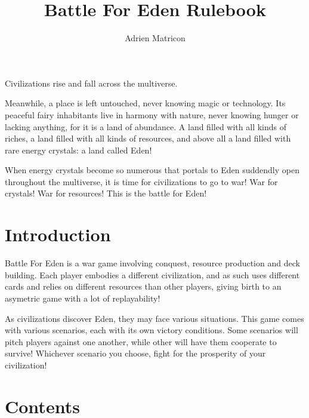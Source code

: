 \documentclass[a4paper]{article}
\author{Adrien Matricon}
\begin{document}
\title{Battle For Eden Rulebook}
\maketitle


    Civilizations rise and fall across the multiverse.

    Meanwhile, a place is left untouched, never knowing magic or technology.
    Its peaceful fairy inhabitants live in harmony with nature, never knowing hunger or lacking anything, for it is a land of abundance.
    A land filled with all kinds of riches, a land filled with all kinds of resources,
    and above all a land filled with rare energy crystals: a land called Eden!

    When energy crystals become so numerous that portals to Eden suddendly open throughout the multiverse,
    it is time for civilizations to go to war! War for crystals! War for resources!
    This is the battle for Eden!



\section{Introduction}

    Battle For Eden is a war game involving conquest, resource production and deck building.
    Each player embodies a different civilization, and as such uses different cards and relies on
    different resources than other players, giving birth to an asymetric game with a lot of replayability!

    As civilizations discover Eden, they may face various situations.
    This game comes with various scenarios, each with its own victory conditions.
    Some scenarios will pitch players against one another, while other will have them cooperate to survive!
    Whichever scenario you choose, fight for the prosperity of your civilization!


\newpage
\section{Contents}
\end{document}
